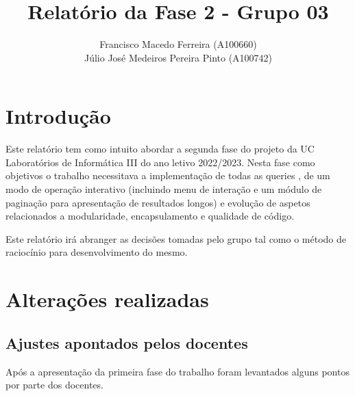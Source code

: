 \documentclass{article}
\title{Relatório da Fase 2 - Grupo 03}
\author{Francisco Macedo Ferreira (A100660)\\Júlio José Medeiros Pereira Pinto (A100742)}
\begin{document}
  
    \maketitle
    
    \section{Introdução}
    Este relatório tem como intuito abordar a segunda fase do projeto da UC Laboratórios 
    de Informática III do ano letivo 2022/2023.
    Nesta fase como objetivos o trabalho necessitava a implementação de todas as queries
    , de um modo de operação interativo (incluindo menu de interação e um módulo de 
    paginação para apresentação de resultados longos) e evolução de aspetos relacionados
    a modularidade, encapsulamento e qualidade de código.
    
    Este relatório irá abranger as decisões tomadas pelo grupo tal como o método de 
    raciocínio para desenvolvimento do mesmo.
    
    \section{Alterações realizadas}
        \subsection{Ajustes apontados pelos docentes}
            Após a apresentação da primeira fase do trabalho foram levantados
            alguns pontos por parte dos docentes. 
\end{document}
